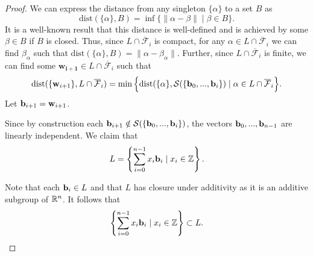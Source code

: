 \documentclass[a4paper,12pt]{article}
\begin{document}
\begin{proof}
We can express the distance from any singleton $\lbrace \alpha \rbrace$ to a set $B$ as $$\text{dist}(\lbrace\alpha\rbrace,B) = \inf\lbrace \|\alpha - \beta\| \mid \beta \in B\rbrace.$$ It is a well-known result that this distance is well-defined and is achieved by some $\beta \in B$ if $B$ is closed. Thus, since $L \cap \overline{\mathcal{F}}_i$ is compact, for any $\alpha \in L \cap \overline{\mathcal{F}}_i$ we can find $\beta_\alpha$ such that $\text{dist}(\lbrace\alpha\rbrace,B) = \|\alpha - \beta_\alpha\|$. Further, since $L \cap \overline{\mathcal{F}}_i$ is finite, we can find some  $\mathbf{w_{i+1}} \in L \cap \overline{\mathcal{F}}_i$ such that $$\text{dist}(\lbrace\mathbf{w}_{i+1}\rbrace, L \cap \overline{\mathcal{F}}_i) = \min\Big\lbrace\text{dist}(\lbrace\alpha\rbrace, \mathcal{S}(\lbrace \mathbf{b}_0,...,\mathbf{b}_i\rbrace)\mid \alpha \in  L \cap \overline{\mathcal{F}}_i\Big\rbrace.$$ Let $\mathbf{b}_{i+1} = \mathbf{w}_{i+1}$. 

Since by construction each $\mathbf{b}_{i+1} \notin \mathcal{S}(\lbrace \mathbf{b}_0,...,\mathbf{b}_i\rbrace)$, the vectors $\mathbf{b}_0,...,\mathbf{b}_{n-1}$ are linearly independent. We claim that $$L = \left\{ \sum_{i=0}^{n-1} x_{i}\mathbf{b}_{i} \mid x_{i} \in \mathbb{Z} \right\}.$$

Note that each $\mathbf{b}_i \in L$ and that $L$ has closure under additivity as it is an additive subgroup of $\mathbb{R}^n$. It follows that $$\left\{ \sum_{i=0}^{n-1} x_{i}\mathbf{b}_{i} \mid x_{i} \in \mathbb{Z} \right\} \subset L.$$


\end{proof}
\end{document}
